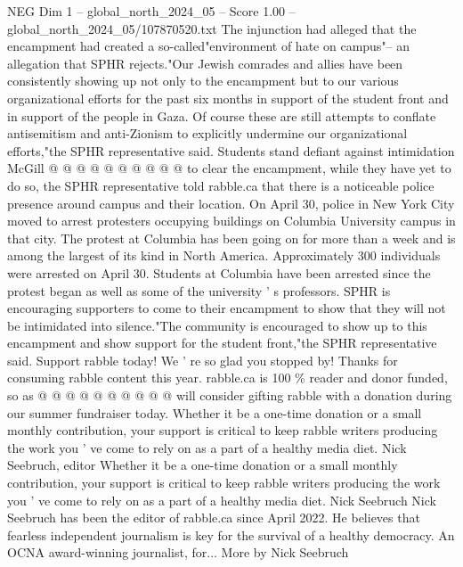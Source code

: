 \begin{textsample}{NEG Dim 1 – global\_north\_2024\_05 – Score 1.00 – global\_north\_2024\_05/107870520.txt}
The injunction had alleged that the encampment had created a so-called"environment of hate on campus"-- an allegation that SPHR rejects."Our Jewish comrades and allies have been consistently showing up not only to the encampment but to our various organizational efforts for the past six months in support of the student front and in support of the people in Gaza.
Of course these are still attempts to conflate antisemitism and anti-Zionism to explicitly undermine our organizational efforts,"the SPHR representative said.
Students stand defiant against intimidation McGill @ @ @ @ @ @ @ @ @ @ to clear the encampment, while they have yet to do so, the SPHR representative told rabble.ca that there is a noticeable police presence around campus and their location.
On April 30, police in New York City moved to arrest protesters occupying buildings on Columbia University campus in that city.
The protest at Columbia has been going on for more than a week and is among the largest of its kind in North America.
Approximately 300 individuals were arrested on April 30.
Students at Columbia have been arrested since the protest began as well as some of the university ' s professors.
SPHR is encouraging supporters to come to their encampment to show that they will not be intimidated into silence."The community is encouraged to show up to this encampment and show support for the student front,"the SPHR representative said.
Support rabble today!
We ' re so glad you stopped by!
Thanks for consuming rabble content this year. rabble.ca is 100 \% reader and donor funded, so as @ @ @ @ @ @ @ @ @ @ will consider gifting rabble with a donation during our summer fundraiser today.
Whether it be a one-time donation or a small monthly contribution, your support is critical to keep rabble writers producing the work you ' ve come to rely on as a part of a healthy media diet.
Nick Seebruch, editor Whether it be a one-time donation or a small monthly contribution, your support is critical to keep rabble writers producing the work you ' ve come to rely on as a part of a healthy media diet.
Nick Seebruch Nick Seebruch has been the editor of rabble.ca since April 2022.
He believes that fearless independent journalism is key for the survival of a healthy democracy.
An OCNA award-winning journalist, for...
More by Nick Seebruch

\end{textsample}
